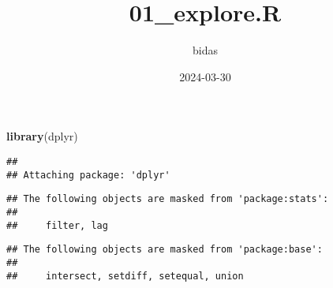 \documentclass[
]{article}
\title{01\_explore.R}
\author{bidas}
\date{2024-03-30}
\newenvironment{Shaded}{\begin{snugshade}}{\end{snugshade}}
\newcommand{\FunctionTok}[1]{\textcolor[rgb]{0.13,0.29,0.53}{\textbf{#1}}}
\newcommand{\NormalTok}[1]{#1}
\begin{document}
\maketitle

\begin{Shaded}
\begin{Highlighting}[]
\FunctionTok{library}\NormalTok{(dplyr)}
\end{Highlighting}
\end{Shaded}

\begin{verbatim}
## 
## Attaching package: 'dplyr'
\end{verbatim}

\begin{verbatim}
## The following objects are masked from 'package:stats':
## 
##     filter, lag
\end{verbatim}

\begin{verbatim}
## The following objects are masked from 'package:base':
## 
##     intersect, setdiff, setequal, union
\end{verbatim}
\end{document}

